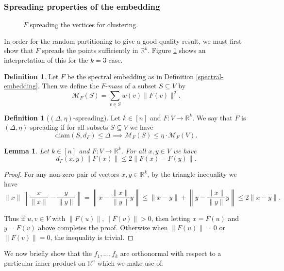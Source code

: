 \documentclass[a4paper,11pt]{article}
\newtheorem{lemma}[theorem]{Lemma}
\theoremstyle{definition}
\newtheorem{definition}[theorem]{Definition}
\newcommand{\R}{\mathbb{R}}
\newcommand{\diam}[1]{\mathrm{diam}\left(#1\right)}
\newcommand{\mass}[1]{\mathcal{M}_F\left(#1\right)}
\begin{document}
\subsubsection{Spreading properties of the embedding}

\begin{figure}
\centering
\def\svgwidth{0.4\textwidth}

\caption{$F$ spreading the vertices for clustering.}\label{spreading-fig}
\end{figure}

In order for the random partitioning to give a good quality result, we must first show that $F$ spreads the points sufficiently in $\R^k$. Figure \ref{spreading-fig} shows an interpretation of this for the $k = 3$ case.

\begin{definition}\label{l2mass}
Let $F$ be the spectral embedding as in Definition \ref{spectral-embedding}. Then we define the $F$-\emph{mass} of a subset $S \subseteq V$ by
\[
\mass{S} = \sum_{v \in S} w(v)\|F(v)\|^2.
\]
\end{definition}

\begin{definition}[$(\Delta, \eta)$-spreading]
Let $k \in [n]$ and $F: V \to \R^k$. We say that $F$ is $(\Delta, \eta)$-spreading if for all subsets $S \subseteq V$ we have
\[
\diam{S, d_F} \le \Delta \implies \mass{S} \le \eta \cdot \mass{V}.
\]
\end{definition}

\begin{lemma}\label{radial-norm-bound}
Let $k \in [n]$ and $F: V \to \R^k$. For all $x, y \in V$ we have
\[d_F(x, y)\|F(x)\| \le 2\|F(x) - F(y)\|.\]
\end{lemma}
\begin{proof}
For any non-zero pair of vectors $x, y \in \mathbb{R}^k$, by the triangle inequality we have
\[
\|x\| \left\|\frac{x}{\|x\|} - \frac{y}{\|y\|}\right\| = \left\|x - \frac{\|x\|}{\|y\|}y\right\| \le \|x - y\| + \left\|y - \frac{\|x\|}{\|y\|}y\right\| \le 2\|x - y\|.
\]

Thus if $u, v \in V$ with $\|F(u)\|, \|F(v)\| > 0$, then letting $x = F(u)$ and $y = F(v)$ above completes the proof. Otherwise when $\|F(u)\| = 0$ or $\|F(v)\| = 0$, the inequality is trivial.
\end{proof}

We now briefly show that the $f_1, \dots, f_k$ are orthonormal with respect to a particular inner product on $\R^n$ which we make use of:
\end{document}

